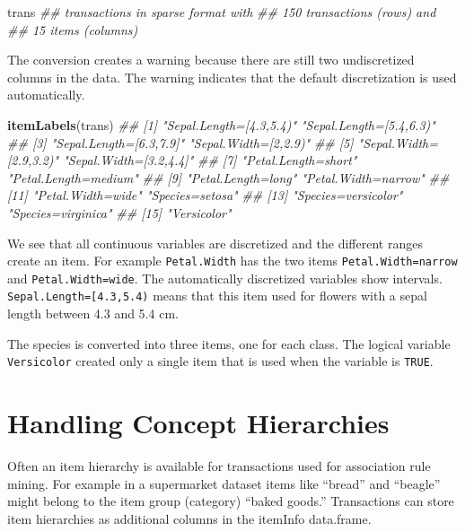\documentclass[
  notitlepage]{book}
\newenvironment{Shaded}{\begin{snugshade}}{\end{snugshade}}
\newcommand{\CommentTok}[1]{\textcolor[rgb]{0.56,0.35,0.01}{\textit{#1}}}
\newcommand{\KeywordTok}[1]{\textcolor[rgb]{0.13,0.29,0.53}{\textbf{#1}}}
\newcommand{\NormalTok}[1]{#1}
\begin{document}
\begin{Shaded}
\begin{Highlighting}[]
\NormalTok{trans}
\CommentTok{\#\# transactions in sparse format with}
\CommentTok{\#\#  150 transactions (rows) and}
\CommentTok{\#\#  15 items (columns)}
\end{Highlighting}
\end{Shaded}

The conversion creates a warning because there are still two undiscretized columns
in the data. The warning indicates that the default discretization is used
automatically.

\begin{Shaded}
\begin{Highlighting}[]
\KeywordTok{itemLabels}\NormalTok{(trans)}
\CommentTok{\#\#  [1] "Sepal.Length=[4.3,5.4)" "Sepal.Length=[5.4,6.3)"}
\CommentTok{\#\#  [3] "Sepal.Length=[6.3,7.9]" "Sepal.Width=[2,2.9)"   }
\CommentTok{\#\#  [5] "Sepal.Width=[2.9,3.2)"  "Sepal.Width=[3.2,4.4]" }
\CommentTok{\#\#  [7] "Petal.Length=short"     "Petal.Length=medium"   }
\CommentTok{\#\#  [9] "Petal.Length=long"      "Petal.Width=narrow"    }
\CommentTok{\#\# [11] "Petal.Width=wide"       "Species=setosa"        }
\CommentTok{\#\# [13] "Species=versicolor"     "Species=virginica"     }
\CommentTok{\#\# [15] "Versicolor"}
\end{Highlighting}
\end{Shaded}

We see that all continuous variables are discretized and the different ranges
create an item. For example \texttt{Petal.Width} has the two items \texttt{Petal.Width=narrow}
and \texttt{Petal.Width=wide}. The automatically discretized variables show intervals.
\texttt{Sepal.Length={[}4.3,5.4)} means that this item used for flowers with
a sepal length between 4.3 and 5.4 cm.

The species is converted into three items, one for each class. The logical
variable \texttt{Versicolor} created only a single item that is used when
the variable is \texttt{TRUE}.

\hypertarget{handling-concept-hierarchies}{%
\section{Handling Concept Hierarchies}\label{handling-concept-hierarchies}}

Often an item hierarchy is available for transactions used for association rule mining. For example in a supermarket dataset items like ``bread'' and ``beagle'' might belong to the item group (category) ``baked goods.''
Transactions can store item hierarchies as additional columns in the itemInfo data.frame.
\end{document}
